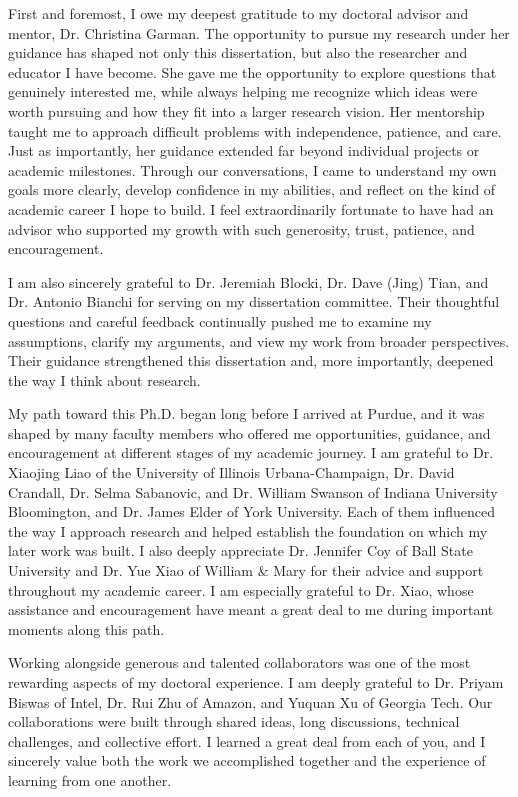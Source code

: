 \begin{acknowledgments}
First and foremost, I owe my deepest gratitude to my doctoral advisor and mentor, Dr. Christina Garman. The opportunity to pursue my research under her guidance has shaped not only this dissertation, but also the researcher and educator I have become. She gave me the opportunity to explore questions that genuinely interested me, while always helping me recognize which ideas were worth pursuing and how they fit into a larger research vision. Her mentorship taught me to approach difficult problems with independence, patience, and care. Just as importantly, her guidance extended far beyond individual projects or academic milestones. Through our conversations, I came to understand my own goals more clearly, develop confidence in my abilities, and reflect on the kind of academic career I hope to build. I feel extraordinarily fortunate to have had an advisor who supported my growth with such generosity, trust, patience, and encouragement.

I am also sincerely grateful to Dr. Jeremiah Blocki, Dr. Dave (Jing) Tian, and Dr. Antonio Bianchi for serving on my dissertation committee. Their thoughtful questions and careful feedback continually pushed me to examine my assumptions, clarify my arguments, and view my work from broader perspectives. Their guidance strengthened this dissertation and, more importantly, deepened the way I think about research.

My path toward this Ph.D. began long before I arrived at Purdue, and it was shaped by many faculty members who offered me opportunities, guidance, and encouragement at different stages of my academic journey. I am grateful to Dr. Xiaojing Liao of the University of Illinois Urbana-Champaign, Dr. David Crandall, Dr. Selma Sabanovic, and Dr. William Swanson of Indiana University Bloomington, and Dr. James Elder of York University. Each of them influenced the way I approach research and helped establish the foundation on which my later work was built. I also deeply appreciate Dr. Jennifer Coy of Ball State University and Dr. Yue Xiao of William \& Mary for their advice and support throughout my academic career. I am especially grateful to Dr. Xiao, whose assistance and encouragement have meant a great deal to me during important moments along this path.

Working alongside generous and talented collaborators was one of the most rewarding aspects of my doctoral experience. I am deeply grateful to Dr. Priyam Biswas of Intel, Dr. Rui Zhu of Amazon, and Yuquan Xu of Georgia Tech. Our collaborations were built through shared ideas, long discussions, technical challenges, and collective effort. I learned a great deal from each of you, and I sincerely value both the work we accomplished together and the experience of learning from one another.


\end{acknowledgments}
